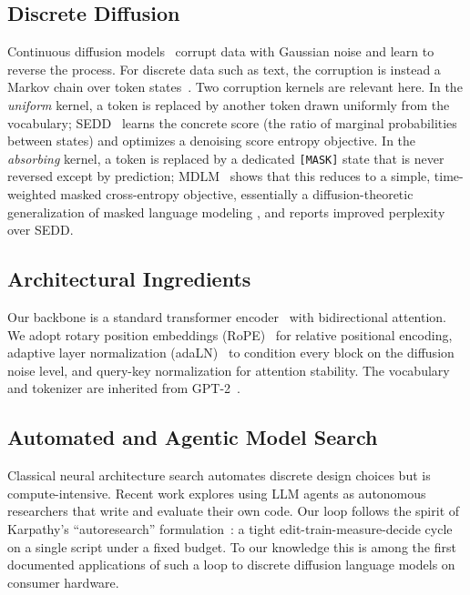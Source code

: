 \documentclass[conference]{IEEEtran}
\begin{document}
\subsection{Discrete Diffusion}
Continuous diffusion models~\cite{sohl,ddpm} corrupt data with Gaussian
noise and learn to reverse the process. For discrete data such as text,
the corruption is instead a Markov chain over token states~\cite{d3pm}.
Two corruption kernels are relevant here. In the \emph{uniform} kernel,
a token is replaced by another token drawn uniformly from the
vocabulary; SEDD~\cite{sedd} learns the concrete score (the ratio of
marginal probabilities between states) and optimizes a denoising score
entropy objective. In the \emph{absorbing} kernel, a token is replaced
by a dedicated \texttt{[MASK]} state that is never reversed except by
prediction; MDLM~\cite{mdlm} shows that this reduces to a simple,
time-weighted masked cross-entropy objective, essentially a
diffusion-theoretic generalization of masked language modeling
\cite{bert}, and reports improved perplexity over SEDD.

\subsection{Architectural Ingredients}
Our backbone is a standard transformer encoder~\cite{transformer} with
bidirectional attention. We adopt rotary position embeddings
(RoPE)~\cite{rope} for relative positional encoding, adaptive layer
normalization (adaLN)~\cite{dit} to condition every block on the
diffusion noise level, and query-key normalization for attention
stability. The vocabulary and tokenizer are inherited from
GPT-2~\cite{gpt2}.

\subsection{Automated and Agentic Model Search}
Classical neural architecture search automates discrete design choices
but is compute-intensive. Recent work explores using LLM agents as
autonomous researchers that write and evaluate their own code. Our loop
follows the spirit of Karpathy's ``autoresearch''
formulation~\cite{autoresearch}: a tight edit-train-measure-decide
cycle on a single script under a fixed budget. To our knowledge this is
among the first documented applications of such a loop to discrete
diffusion language models on consumer hardware.
\end{document}
